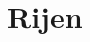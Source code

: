 \documentclass[main.tex]{subfiles}
\begin{document}
\chapter{Rijen}
\label{cha:rijen}


\end{document}
